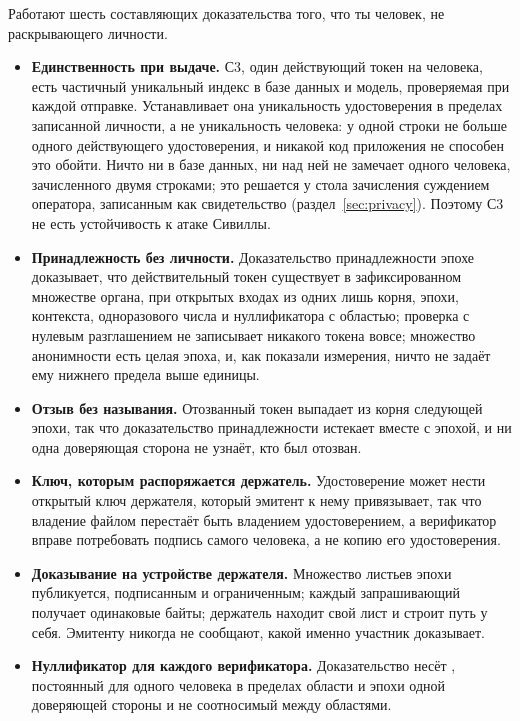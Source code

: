 Работают шесть составляющих доказательства того, что ты человек, не раскрывающего личности.

\begin{itemize}
  \item \textbf{Единственность при выдаче.} С3, один действующий токен на человека, есть частичный
    уникальный индекс в базе данных и модель, проверяемая при каждой отправке. Устанавливает она уникальность удостоверения в пределах записанной личности, а не
    уникальность человека: у одной строки  не больше одного действующего удостоверения,
    и никакой код приложения не способен это обойти. Ничто ни в базе данных, ни над ней не замечает
    одного человека, зачисленного двумя строками; это решается у стола зачисления суждением оператора,
    записанным как свидетельство (раздел~\ref{sec:privacy}).
    Поэтому С3 не есть устойчивость к атаке Сивиллы. \sImpl
  \item \textbf{Принадлежность без личности.} Доказательство принадлежности эпохе доказывает, что
    действительный токен существует в зафиксированном множестве органа, при открытых входах из
    одних лишь корня, эпохи, контекста, одноразового числа и нуллификатора с областью; проверка с
    нулевым разглашением не записывает никакого токена вовсе; множество анонимности есть целая
    эпоха, и, как показали измерения, ничто не задаёт ему нижнего предела выше единицы. \sImpl
  \item \textbf{Отзыв без называния.} Отозванный токен выпадает из корня следующей эпохи, так что
    доказательство принадлежности истекает вместе с эпохой, и ни одна доверяющая сторона не
    узнаёт, кто был отозван. \sImpl
  \item \textbf{Ключ, которым распоряжается держатель.} Удостоверение может нести открытый ключ
    держателя, который эмитент к нему привязывает, так что владение файлом перестаёт быть владением
    удостоверением, а верификатор вправе потребовать подпись самого человека, а не копию его
    удостоверения. \sImpl
  \item \textbf{Доказывание на устройстве держателя.} Множество листьев эпохи публикуется,
    подписанным и ограниченным; каждый запрашивающий получает одинаковые байты; держатель находит
    свой лист и строит путь у себя. Эмитенту никогда не сообщают, какой именно участник
    доказывает. \sImpl
  \item \textbf{Нуллификатор для каждого верификатора.} Доказательство несёт
    , постоянный для одного человека в пределах
    области и эпохи одной доверяющей стороны и не соотносимый между областями. \sImpl
\end{itemize}

